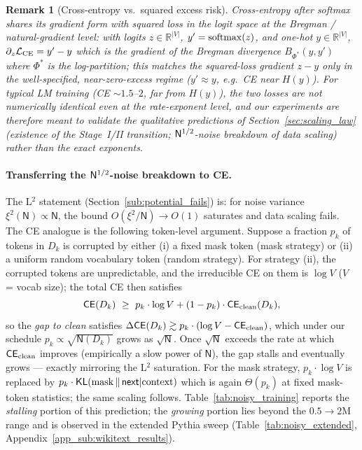 \documentclass[11pt]{article}
\theoremstyle{plain}
\newtheorem{remark}[theorem]{Remark}
\newcommand{\R}{\mathbb{R}}
\begin{document}
\begin{remark}[Cross-entropy vs.\ squared excess risk]\label{rem:ce_l2}
Cross-entropy after softmax shares its gradient form with squared loss in the logit space at the {\it Bregman / natural-gradient} level: with logits $z\in\R^{|V|}$, $y'={\rm softmax}(z)$, and one-hot $y\in\R^{|V|}$, $\partial_z {\cal L}_{\rm CE} = y'-y$ which is the gradient of the Bregman divergence $B_{\Phi^*}(y, y')$ where $\Phi^*$ is the log-partition; this matches the squared-loss gradient $z-y$ {\it only} in the well-specified, near-zero-excess regime ($y'\approx y$, e.g.~CE near $H(y)$). For typical LM training (CE $\sim 1.5$--$2$, far from $H(y)$), the two losses are not numerically identical even at the rate-exponent level, and our experiments are therefore meant to validate the {\it qualitative} predictions of Section~\ref{sec:scaling_law} (existence of the Stage~I/II transition; ${\sf N}^{1/2}$-noise breakdown of data scaling) rather than the exact exponents.
\end{remark}

\paragraph{Transferring the ${\sf N}^{1/2}$-noise breakdown to CE.} The L$^2$ statement (Section~\ref{sub:potential_fails}) is: for noise variance $\xi^2(\mathsf{N})\propto \mathsf{N}$, the bound $O(\xi^2/\mathsf{N})\to O(1)$ saturates and data scaling fails. The CE analogue is the following token-level argument. Suppose a fraction $p_k$ of tokens in $D_k$ is corrupted by either (i) a fixed mask token (mask strategy) or (ii) a uniform random vocabulary token (random strategy). For strategy (ii), the corrupted tokens are unpredictable, and the irreducible CE on them is $\log V$ ($V$ = vocab size); the total CE then satisfies
\[
{\sf CE}(D_k) \ \ge\ p_k \cdot \log V + (1-p_k)\cdot {\sf CE}_{\rm clean}(D_k),
\]
so the {\it gap to clean} satisfies $\Delta {\sf CE}(D_k) \gtrsim p_k \cdot (\log V - {\sf CE}_{\rm clean})$, which under our schedule $p_k \propto \sqrt{\mathsf{N}(D_k)}$ grows as $\sqrt{\mathsf{N}}$. Once $\sqrt{\mathsf{N}}$ exceeds the rate at which ${\sf CE}_{\rm clean}$ improves (empirically a slow power of $\mathsf{N}$), the gap stalls and eventually grows --- exactly mirroring the L$^2$ saturation. For the mask strategy, $p_k\cdot \log V$ is replaced by $p_k\cdot {\sf KL}({\rm mask}\,\|\,{\sf next}|{\rm context})$ which is again $\Theta(p_k)$ at fixed mask-token statistics; the same scaling follows. Table~\ref{tab:noisy_training} reports the {\it stalling} portion of this prediction; the {\it growing} portion lies beyond the $0.5\to 2$M range and is observed in the extended Pythia sweep (Table~\ref{tab:noisy_extended}, Appendix~\ref{app_sub:wikitext_results}).
\end{document}
